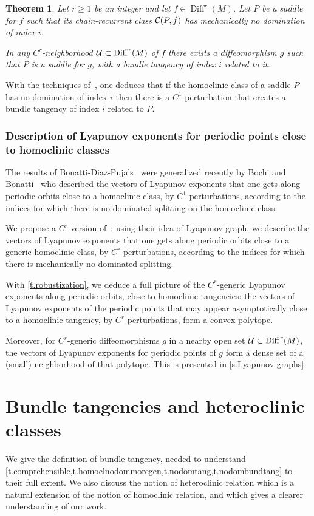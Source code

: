 \documentclass[11pt, a4paper]{amsart}
\theoremstyle{plain}
\newtheorem{theorem}{Theorem} %
\theoremstyle{definition}
\theoremstyle{remark}
\numberwithin{equation}{section}         %
\DeclareMathOperator{\Diff}{{Diff}}
\def\Diff{\operatorname{Diff}}
\begin{document}
\begin{theorem}\label{t.nodombundtang}
 Let $r\geq 1$ be an integer and let $f\in\Diff^r(M)$. Let $P$ be a saddle for $f$ such that its chain-recurrent class ${\mathcal C}(P,f)$ has mechanically no domination of index $i$. 
 
 In any $C^r$-neighborhood $\cU\subset \Diff^r(M)$ of $f$ there exists a diffeomorphism $g$ such that $P$ is a saddle for $g$, with a bundle tangency of index $i$ related to it.
\end{theorem}

With the techniques of~\cite{BCDG}, one deduces that if the homoclinic class of a saddle $P$ has no domination of  index $i$ then there is a $C^1$-perturbation that creates a bundle tangency of index $i$ related to $P$.

\subsubsection{Description of Lyapunov exponents  for periodic points close to homoclinic classes}
The results of Bonatti-Diaz-Pujals~\cite{BDP} were generalized recently by Bochi and Bonatti~\cite{BB} who described the vectors of Lyapunov exponents that one gets along periodic orbits close to a homoclinic class, by $C^1$-perturbations, according to the indices for which there is no dominated splitting on the homoclinic class.  

We propose a $C^r$-version of~\cite{BB}: using their idea of Lyapunov graph, we describe the vectors of Lyapunov exponents that one gets along periodic orbits close to a generic homoclinic class, by $C^r$-perturbations, according to the indices for which there is mechanically no dominated splitting. 

With \cref{t.robustization}, we deduce a full picture of the $C^r$-generic Lyapunov exponents along periodic orbits, close to homoclinic tangencies: the vectors of Lyapunov exponents of the periodic points that may appear asymptotically close to a homoclinic tangency,  by $C^r$-perturbations, form a convex polytope. 

Moreover, for $C^r$-generic diffeomorphisms $g$ in a nearby open set $\cU\subset \Diff^r(M)$, the vectors of Lyapunov exponents for periodic points of $g$ form a dense set of a (small) neighborhood of that polytope. This is presented in \cref{s.Lyapunov graphs}.


\section{Bundle tangencies and heteroclinic classes}\label{s.mechnodom}
We give the definition of bundle tangency, needed to understand \cref{t.comprehensible,t.homoclnodommoregen,t.nodomtang,t.nodombundtang} to their full extent. We also discuss the notion of heteroclinic relation which is a natural extension of the notion of homoclinic relation, and which gives a clearer understanding of our work.
\end{document}
